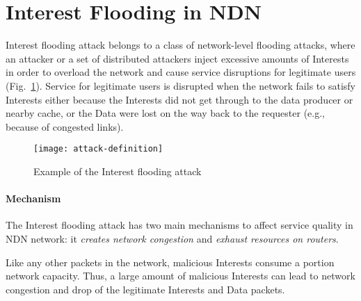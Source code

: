 \section{Interest Flooding in NDN}
\label{sec:interest flooding}




Interest flooding attack belongs to a class of network-level flooding attacks, where an attacker or a set of distributed attackers inject excessive amounts of Interests in order to overload the network and cause service disruptions for legitimate users (Fig.~\ref{fig:flooding example}).
Service for legitimate users is disrupted when the network fails to satisfy Interests either because the Interests did not get through to the data producer or nearby cache, or the Data were lost on the way back to the requester (e.g., because of congested links).

\begin{figure}[htbp]
  \centering
  \texttt{[image: attack-definition]}
  \caption{Example of the Interest flooding attack}
  \label{fig:flooding example}
\end{figure}

\paragraph{Mechanism}

The Interest flooding attack has two main mechanisms to affect service quality in NDN network: it \emph{creates network congestion} and \emph{exhaust resources on routers}.

Like any other packets in the network, malicious Interests consume a portion network capacity.
Thus, a large amount of malicious Interests can lead to network congestion and drop of the legitimate Interests and Data packets.

